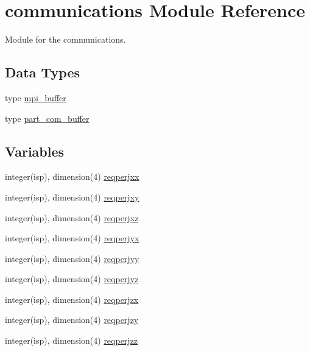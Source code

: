 \hypertarget{namespacecommunications}{}\section{communications Module Reference}
\label{namespacecommunications}


Module for the communications.  


\subsection*{Data Types}
\begin{DoxyCompactItemize}
\item 
type \hyperlink{structcommunications_1_1mpi__buffer}{mpi\+\_\+buffer}
\item 
type \hyperlink{structcommunications_1_1part__com__buffer}{part\+\_\+com\+\_\+buffer}
\end{DoxyCompactItemize}
\subsection*{Variables}
\begin{DoxyCompactItemize}
\item 
integer(isp), dimension(4) \hyperlink{namespacecommunications_ab09f2571f6d9283fbc47609b3e6de32a}{reqperjxx}
\item 
integer(isp), dimension(4) \hyperlink{namespacecommunications_a579ce4f6ca8641ffb00fd802371714c3}{reqperjxy}
\item 
integer(isp), dimension(4) \hyperlink{namespacecommunications_afa5731d4931bff540f2d1e62849afb6c}{reqperjxz}
\item 
integer(isp), dimension(4) \hyperlink{namespacecommunications_a44e505738aca0afddea17f1b8800be28}{reqperjyx}
\item 
integer(isp), dimension(4) \hyperlink{namespacecommunications_afc48247f3f83606f2b7c1e498621fcd5}{reqperjyy}
\item 
integer(isp), dimension(4) \hyperlink{namespacecommunications_ae4760ee5787c5b5981856095495ea82d}{reqperjyz}
\item 
integer(isp), dimension(4) \hyperlink{namespacecommunications_a9a0f53e00bdcaa044856f745008de045}{reqperjzx}
\item 
integer(isp), dimension(4) \hyperlink{namespacecommunications_a76e287cb90a1968309c7e2370420748c}{reqperjzy}
\item 
integer(isp), dimension(4) \hyperlink{namespacecommunications_af38ed57408b60ed5170d54b350aa1b32}{reqperjzz}
\end{DoxyCompactItemize}



